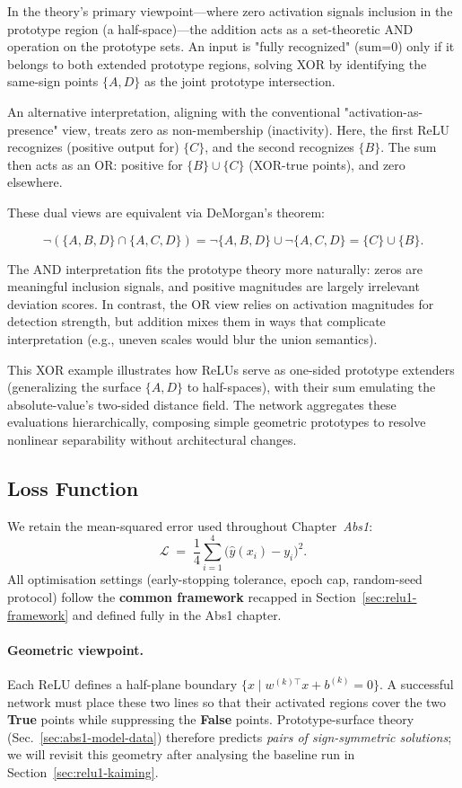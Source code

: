 In the theory's primary viewpoint---where zero activation signals inclusion in the prototype region (a half-space)---the addition acts as a set-theoretic AND operation on the prototype sets. An input is "fully recognized" (sum=0) only if it belongs to both extended prototype regions, solving XOR by identifying the same-sign points $\{A, D\}$ as the joint prototype intersection.

An alternative interpretation, aligning with the conventional "activation-as-presence" view, treats zero as non-membership (inactivity). Here, the first ReLU recognizes (positive output for) $\{C\}$, and the second recognizes $\{B\}$. The sum then acts as an OR: positive for $\{B\} \cup \{C\}$ (XOR-true points), and zero elsewhere.

These dual views are equivalent via DeMorgan's theorem:

\[
    \neg(\{A, B, D\} \cap \{A, C, D\}) = \neg\{A, B, D\} \cup \neg\{A, C, D\} = \{C\} \cup \{B\}.
\]

The AND interpretation fits the prototype theory more naturally: zeros are meaningful inclusion signals, and positive magnitudes are largely irrelevant deviation scores. In contrast, the OR view relies on activation magnitudes for detection strength, but addition mixes them in ways that complicate interpretation (e.g., uneven scales would blur the union semantics).

This XOR example illustrates how ReLUs serve as one-sided prototype extenders (generalizing the surface $\{A, D\}$ to half-spaces), with their sum emulating the absolute-value's two-sided distance field. The network aggregates these evaluations hierarchically, composing simple geometric prototypes to resolve nonlinear separability without architectural changes.

\subsection*{Loss Function}
We retain the mean-squared error used throughout Chapter~\textit{Abs1}:
\begin{equation}
    \mathcal{L}
    \;=\;
    \frac14
    \sum_{i=1}^{4}
    \bigl(\hat y(x_i) - y_i\bigr)^2.
    \label{eq:relu1-loss}
\end{equation}
All optimisation settings (early-stopping tolerance, epoch cap, random-seed protocol) follow the \textbf{common framework} recapped in Section~\ref{sec:relu1-framework} and defined fully in the Abs1 chapter.

\paragraph{Geometric viewpoint.}
Each ReLU defines a half-plane boundary \(\{x\mid w^{(k)\!\top}x+b^{(k)}=0\}\). A successful network must place these two lines so that their activated regions cover the two \textbf{True} points while suppressing the \textbf{False} points. Prototype-surface theory (Sec.~\ref{sec:abs1-model-data}) therefore predicts \emph{pairs of sign-symmetric solutions}; we will revisit this geometry after analysing the baseline run in Section~\ref{sec:relu1-kaiming}.
